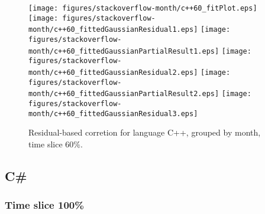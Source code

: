 \begin{figure}[hb]
\centering
{}
{\texttt{[image: figures/stackoverflow-month/c++60\_fitPlot.eps]}}
{\texttt{[image: figures/stackoverflow-month/c++60\_fittedGaussianResidual1.eps]}}
{\texttt{[image: figures/stackoverflow-month/c++60\_fittedGaussianPartialResult1.eps]}}
{\texttt{[image: figures/stackoverflow-month/c++60\_fittedGaussianResidual2.eps]}}
{\texttt{[image: figures/stackoverflow-month/c++60\_fittedGaussianPartialResult2.eps]}}
{\texttt{[image: figures/stackoverflow-month/c++60\_fittedGaussianResidual3.eps]}}
\caption{Residual-based corretion for language C++, grouped by month, time slice 60\%.}
\end{figure}


\clearpage 
\newpage 


\subsection{C\#}

\FloatBarrier

\subsubsection{Time slice 100\%}

